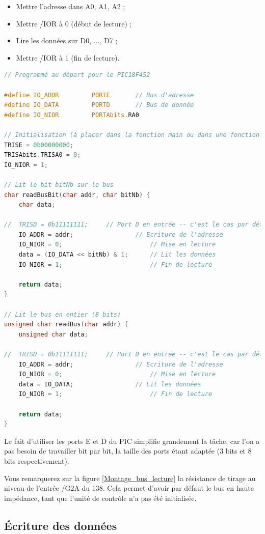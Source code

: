 \documentclass[a4paper]{article}
\begin{document}
\begin{itemize}
	\item Mettre l'adresse dans A0, A1, A2 ;
	\item Mettre /IOR à 0 (début de lecture) ;
	\item Lire les données sur D0, ..., D7 ;
	\item Mettre /IOR à 1 (fin de lecture).
\end{itemize}

\begin{lstlisting}[caption=Implémentation en C pour la lecture sur le bus, label=Implementation_en_C_pour_la_lecture_sur_le_bus, language=c]
// Programmé au départ pour le PIC18F452

#define IO_ADDR			PORTE		// Bus d'adresse
#define IO_DATA			PORTD		// Bus de donnée
#define IO_NIOR			PORTAbits.RA0

// Initialisation (à placer dans la fonction main ou dans une fonction d'initialisation du bus)
TRISE = 0b00000000;
TRISAbits.TRISA0 = 0;
IO_NIOR = 1;

// Lit le bit bitNb sur le bus
char readBusBit(char addr, char bitNb) {
	char data;

//	TRISD = 0b11111111;		// Port D en entrée -- c'est le cas par défaut
	IO_ADDR = addr;					// Ecriture de l'adresse
	IO_NIOR = 0;						// Mise en lecture
	data = (IO_DATA << bitNb) & 1;		// Lit les données
	IO_NIOR = 1;						// Fin de lecture

	return data;
}

// Lit le bus en entier (8 bits)
unsigned char readBus(char addr) {
	unsigned char data;

//	TRISD = 0b11111111;		// Port D en entrée -- c'est le cas par défaut
	IO_ADDR = addr;					// Ecriture de l'adresse
	IO_NIOR = 0;						// Mise en lecture
	data = IO_DATA;					// Lit les données
	IO_NIOR = 1;						// Fin de lecture

	return data;
}
\end{lstlisting}

Le fait d'utiliser les ports E et D du PIC simplifie grandement la tâche, car l'on a pas besoin de travailler bit par bit, la taille des ports étant adaptée (3 bits et 8 bits respectivement).

Vous remarquerez sur la figure \ref{Montage_bus_lecture} la résistance de tirage au niveau de l'entrée /G2A du 138. Cela permet d'avoir par défaut le bus en haute impédance, tant que l'unité de contrôle n'a pas été initialisée.

\subsection{Écriture des données}
\end{document}
